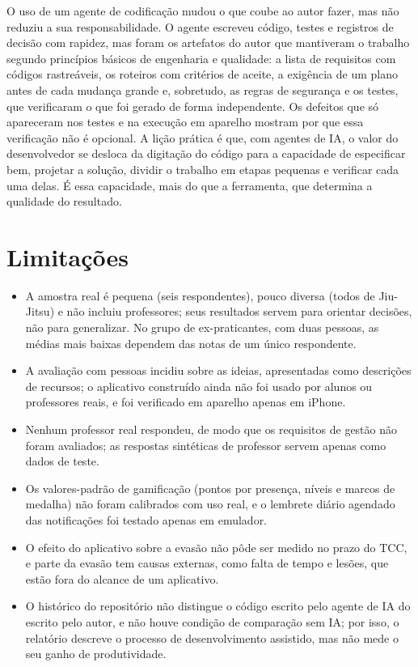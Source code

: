 O uso de um agente de codificação mudou o que coube ao autor fazer, mas
não reduziu a sua responsabilidade. O agente escreveu código, testes e
registros de decisão com rapidez, mas foram os artefatos do autor que
mantiveram o trabalho segundo princípios básicos de engenharia e qualidade: a lista de requisitos com códigos
rastreáveis, os roteiros com critérios de aceite, a exigência de um plano
antes de cada mudança grande e, sobretudo, as regras de segurança e os
testes, que verificaram o que foi gerado de forma independente. Os
defeitos que só apareceram nos testes e na execução em aparelho mostram
por que essa verificação não é opcional. A lição prática é que, com
agentes de IA, o valor do desenvolvedor se desloca da digitação do código
para a capacidade de especificar bem, projetar a solução, dividir o
trabalho em etapas pequenas e verificar cada uma delas. É essa
capacidade, mais do que a ferramenta, que determina a qualidade do
resultado.

\section{Limitações}

\begin{itemize}
  \item A amostra real é pequena (seis respondentes), pouco diversa
        (todos de Jiu-Jitsu) e não incluiu professores; seus resultados
        servem para orientar decisões, não para generalizar. No grupo de
        ex-praticantes, com duas pessoas, as médias mais baixas dependem
        das notas de um único respondente.
  \item A avaliação com pessoas incidiu sobre as ideias, apresentadas
        como descrições de recursos; o aplicativo construído ainda não foi
        usado por alunos ou professores reais, e foi verificado em aparelho
        apenas em iPhone.
  \item Nenhum professor real respondeu, de modo que os requisitos de
        gestão não foram avaliados; as respostas sintéticas de professor
        servem apenas como dados de teste.
  \item Os valores-padrão de gamificação (pontos por presença, níveis e
        marcos de medalha) não foram calibrados com uso real, e o lembrete
        diário agendado das notificações foi testado apenas em emulador.
  \item O efeito do aplicativo sobre a evasão não pôde ser medido no prazo
        do TCC, e parte da evasão tem causas externas, como falta de tempo
        e lesões, que estão fora do alcance de um aplicativo.
  \item O histórico do repositório não distingue o código escrito pelo
        agente de IA do escrito pelo autor, e não houve condição de
        comparação sem IA; por isso, o relatório descreve o processo de
        desenvolvimento assistido, mas não mede o seu ganho de
        produtividade.
\end{itemize}

